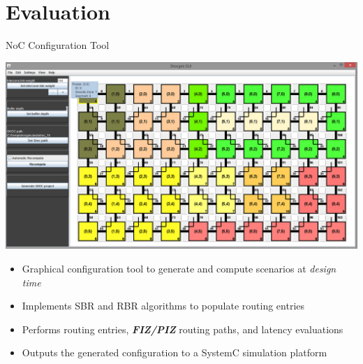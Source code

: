 \section{Evaluation}\label{sec:evaluation}
\begin{frame}[t]{NoC Configuration Tool}
	\begin{center}
		\includegraphics[width=0.75\linewidth]{images/evaluation/shocgentool.png}
	\end{center}
	\begin{itemize}
		\item<only@1> Graphical configuration tool to generate and compute scenarios at \textit{design time}
		
		\item<only@2> Implements SBR and RBR algorithms to populate routing entries
		
		\item<only@3> Performs routing entries, \textbf{\textit{FIZ/PIZ}} routing paths, and latency evaluations
		
		\item<only@4> Outputs the generated configuration to a SystemC simulation platform
	\end{itemize}
\end{frame}

